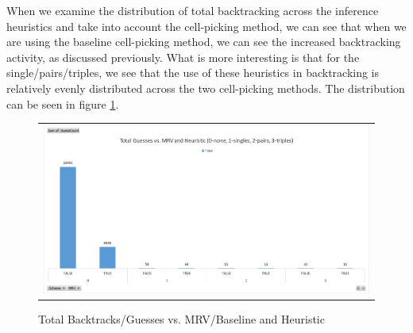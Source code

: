 \documentclass{article}
\begin{document}
When we examine the distribution of total backtracking across the inference heuristics and take into account the cell-picking method, we can see that when we are using the baseline cell-picking method, we can see the increased backtracking activity, as discussed previously. What is more interesting is that for the single/pairs/triples, we see that the use of these heuristics in backtracking is relatively evenly distributed across the two cell-picking methods. The distribution can be seen in figure \ref{fig:total_backtracks_vs_mrv_heuristic}.

\begin{figure}[H]%
	\centering\begin{tabular}{c}
		\includegraphics[scale=0.4]{plots/total-backtrack-guesses-vs-mrv-and-heuristic.png}\\
	\end{tabular}
	\caption{Total Backtracks/Guesses vs. MRV/Baseline and Heuristic}%
	\label{fig:total_backtracks_vs_mrv_heuristic}%
\end{figure}
\end{document}
